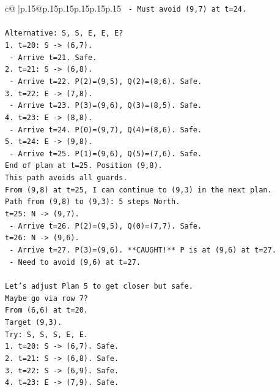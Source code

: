 \documentclass{article}
\begin{document}
{\begin{supertabular}{c@{$\;$}|p{.15\linewidth}@{}p{.15\linewidth}p{.15\linewidth}p{.15\linewidth}p{.15\linewidth}p{.15\linewidth}}
{{{\texttt{   {-} Must avoid (9,7) at t=24.} \\
\\ 
\texttt{Alternative: S, S, E, E, E?} \\
\texttt{1. t=20: S {-}> (6,7).} \\
\texttt{   {-} Arrive t=21. Safe.} \\
\texttt{2. t=21: S {-}> (6,8).} \\
\texttt{   {-} Arrive t=22. P(2)=(9,5), Q(2)=(8,6). Safe.} \\
\texttt{3. t=22: E {-}> (7,8).} \\
\texttt{   {-} Arrive t=23. P(3)=(9,6), Q(3)=(8,5). Safe.} \\
\texttt{4. t=23: E {-}> (8,8).} \\
\texttt{   {-} Arrive t=24. P(0)=(9,7), Q(4)=(8,6). Safe.} \\
\texttt{5. t=24: E {-}> (9,8).} \\
\texttt{   {-} Arrive t=25. P(1)=(9,6), Q(5)=(7,6). Safe.} \\
\texttt{End of plan at t=25. Position (9,8).} \\
\texttt{This path avoids all guards.} \\
\texttt{From (9,8) at t=25, I can continue to (9,3) in the next plan.} \\
\texttt{Path from (9,8) to (9,3): 5 steps North.} \\
\texttt{t=25: N {-}> (9,7).} \\
\texttt{   {-} Arrive t=26. P(2)=(9,5), Q(0)=(7,7). Safe.} \\
\texttt{t=26: N {-}> (9,6).} \\
\texttt{   {-} Arrive t=27. P(3)=(9,6). **CAUGHT!** P is at (9,6) at t=27.} \\
\texttt{   {-} Need to avoid (9,6) at t=27.} \\
\\ 
\texttt{Let's adjust Plan 5 to get closer but safe.} \\
\texttt{Maybe go via row 7?} \\
\texttt{From (6,6) at t=20.} \\
\texttt{Target (9,3).} \\
\texttt{Try: S, S, S, E, E.} \\
\texttt{1. t=20: S {-}> (6,7). Safe.} \\
\texttt{2. t=21: S {-}> (6,8). Safe.} \\
\texttt{3. t=22: S {-}> (6,9). Safe.} \\
\texttt{4. t=23: E {-}> (7,9). Safe.} \\
}}}
\end{supertabular}}
\end{document}
